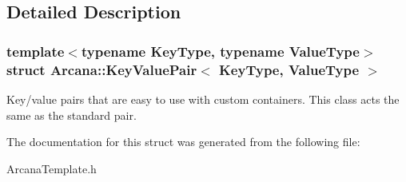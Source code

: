 \subsection{Detailed Description}
\subsubsection*{template$<$typename Key\+Type, typename Value\+Type$>$\newline
struct Arcana\+::\+Key\+Value\+Pair$<$ Key\+Type, Value\+Type $>$}

Key/value pairs that are easy to use with custom containers. This class acts the same as the standard pair. 

The documentation for this struct was generated from the following file\+:\begin{DoxyCompactItemize}
\item 
Arcana\+Template.\+h\end{DoxyCompactItemize}
